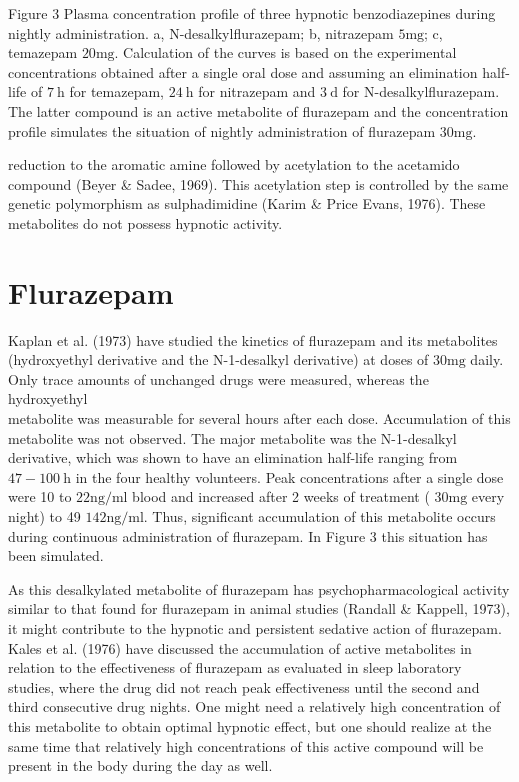 \documentclass[10pt]{article}
\begin{document}
Figure 3 Plasma concentration profile of three hypnotic benzodiazepines during nightly administration. a, N-desalkylflurazepam; b, nitrazepam $5 \mathrm{mg}$; c, temazepam $20 \mathrm{mg}$. Calculation of the curves is based on the experimental concentrations obtained after a single oral dose and assuming an elimination half-life of $7 \mathrm{~h}$ for temazepam, $24 \mathrm{~h}$ for nitrazepam and $3 \mathrm{~d}$ for $\mathrm{N}$-desalkylflurazepam. The latter compound is an active metabolite of flurazepam and the concentration profile simulates the situation of nightly administration of flurazepam $30 \mathrm{mg}$.

reduction to the aromatic amine followed by acetylation to the acetamido compound (Beyer \& Sadee, 1969). This acetylation step is controlled by the same genetic polymorphism as sulphadimidine (Karim \& Price Evans, 1976). These metabolites do not possess hypnotic activity.

\section*{Flurazepam}
Kaplan et al. (1973) have studied the kinetics of flurazepam and its metabolites (hydroxyethyl derivative and the $\mathrm{N}$-1-desalkyl derivative) at doses of $30 \mathrm{mg}$ daily. Only trace amounts of unchanged drugs were measured, whereas the hydroxyethyl\\
metabolite was measurable for several hours after each dose. Accumulation of this metabolite was not observed. The major metabolite was the N-1-desalkyl derivative, which was shown to have an elimination half-life ranging from $47-100 \mathrm{~h}$ in the four healthy volunteers. Peak concentrations after a single dose were 10 to $22 \mathrm{ng} / \mathrm{ml}$ blood and increased after 2 weeks of treatment ( $30 \mathrm{mg}$ every night) to 49 $142 \mathrm{ng} / \mathrm{ml}$. Thus, significant accumulation of this metabolite occurs during continuous administration of flurazepam. In Figure 3 this situation has been simulated.

As this desalkylated metabolite of flurazepam has psychopharmacological activity similar to that found for flurazepam in animal studies (Randall \& Kappell, 1973), it might contribute to the hypnotic and persistent sedative action of flurazepam. Kales et al. (1976) have discussed the accumulation of active metabolites in relation to the effectiveness of flurazepam as evaluated in sleep laboratory studies, where the drug did not reach peak effectiveness until the second and third consecutive drug nights. One might need a relatively high concentration of this metabolite to obtain optimal hypnotic effect, but one should realize at the same time that relatively high concentrations of this active compound will be present in the body during the day as well.
\end{document}
